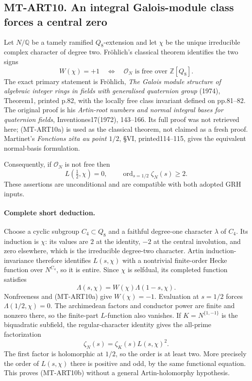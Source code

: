 \subsection*{MT-ART10. An integral Galois-module class forces a central zero}

Let $N/\mathbb Q$ be a tamely ramified $Q_8$-extension and let
$\chi$ be the unique irreducible complex character of degree two.
Fr\"ohlich's classical theorem identifies the two signs
\[
 W(\chi)=+1\quad\Longleftrightarrow\quad
       \mathcal O_N\text{ is free over }\mathbb Z[Q_8].
 \tag{MT-ART10a}
\]
The exact primary statement is Fr\"ohlich, \emph{The Galois
module structure of algebraic integer rings in fields with
generalised quaternion group} (1974), Theorem1, printed p.82,
with the locally free class invariant defined on pp.81--82.
The original proof is his \emph{Artin-root numbers and normal
integral bases for quaternion fields}, Inventiones17(1972),
143--166. Its full proof was not retrieved here; (MT-ART10a)
is used as the classical theorem, not claimed as a fresh proof.
Martinet's \emph{Fonctions z\^eta au point $1/2$}, \S VI,
printed114--115, gives the equivalent normal-basis formulation.

Consequently, if $\mathcal O_N$ is not free then
\[
 L(\tfrac12,\chi)=0,
 \qquad \operatorname{ord}_{s=1/2}\zeta_N(s)\ge2.
 \tag{MT-ART10b}
\]
These assertions are unconditional and are compatible with
both adopted GRH inputs.

\paragraph{Complete short deduction.}
Choose a cyclic subgroup $C_4\subset Q_8$ and a faithful
degree-one character $\lambda$ of $C_4$. Its induction is
$\chi$: its values are $2$ at the identity, $-2$ at the central
involution, and zero elsewhere, which is the irreducible
degree-two character. Artin induction-invariance therefore
identifies $L(s,\chi)$ with a nontrivial finite-order Hecke
function over $N^{C_4}$, so it is entire. Since $\chi$ is
selfdual, its completed function satisfies
\[
                 \Lambda(s,\chi)=W(\chi)\Lambda(1-s,\chi).
\]
Nonfreeness and (MT-ART10a) give $W(\chi)=-1$. Evaluation at
$s=1/2$ forces $\Lambda(1/2,\chi)=0$. The archimedean factors
and conductor power are finite and nonzero there, so the
finite-part $L$-function also vanishes. If $K=N^{\{1,-1\}}$
is the biquadratic subfield, the regular-character identity
gives the all-prime factorization
\[
                         \zeta_N(s)=\zeta_K(s)L(s,\chi)^2.
\]
The first factor is holomorphic at $1/2$, so the order is at
least two. More precisely the order of $L(s,\chi)$ there is
positive and odd, by the same functional equation. This proves
(MT-ART10b) without a general Artin-holomorphy hypothesis.

